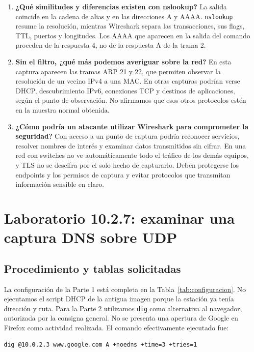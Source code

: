 \documentclass[11pt,a4paper]{article}
\begin{document}
\begin{enumerate}[label=\textbf{\arabic*.},leftmargin=*]
\item \textbf{¿Qué similitudes y diferencias existen con nslookup?}
La salida coincide en la cadena de alias y en las direcciones A y AAAA.
\texttt{nslookup} resume la resolución, mientras Wireshark separa las
transacciones, sus flags, TTL, puertos y longitudes. Los AAAA que aparecen
en la salida del comando proceden de la respuesta 4, no de la respuesta A
de la trama 2.

\item \textbf{Sin el filtro, ¿qué más podemos averiguar sobre la red?}
En esta captura aparecen las tramas ARP 21 y 22, que permiten observar la
resolución de un vecino IPv4 a una MAC. En otras capturas podrían verse
DHCP, descubrimiento IPv6, conexiones TCP y destinos de aplicaciones, según
el punto de observación. No afirmamos que esos otros protocolos estén en
la muestra normal obtenida.

\item \textbf{¿Cómo podría un atacante utilizar Wireshark para comprometer
la seguridad?} Con acceso a un punto de captura podría reconocer servicios,
resolver nombres de interés y examinar datos transmitidos sin cifrar. En
una red con switches no ve automáticamente todo el tráfico de los demás
equipos, y TLS no se descifra por el solo hecho de capturarlo. Deben
protegerse los endpoints y los permisos de captura y evitar protocolos
que transmitan información sensible en claro.
\end{enumerate}

\section{Laboratorio 10.2.7: examinar una captura DNS sobre UDP}
\label{sec:lab2}

\subsection{Procedimiento y tablas solicitadas}

La configuración de la Parte 1 está completa en la
Tabla~\ref{tab:configuracion}. No ejecutamos el script DHCP de la antigua
imagen porque la estación ya tenía dirección y ruta. Para la Parte 2
utilizamos \texttt{dig} como alternativa al navegador, autorizada por la
consigna general. No se presenta una apertura de Google en Firefox como
actividad realizada. El comando efectivamente ejecutado fue:

\par\noindent\begin{minipage}{\linewidth}
\begin{lstlisting}
dig @10.0.2.3 www.google.com A +noedns +time=3 +tries=1
\end{lstlisting}
\end{minipage}\par\medskip
\end{document}
